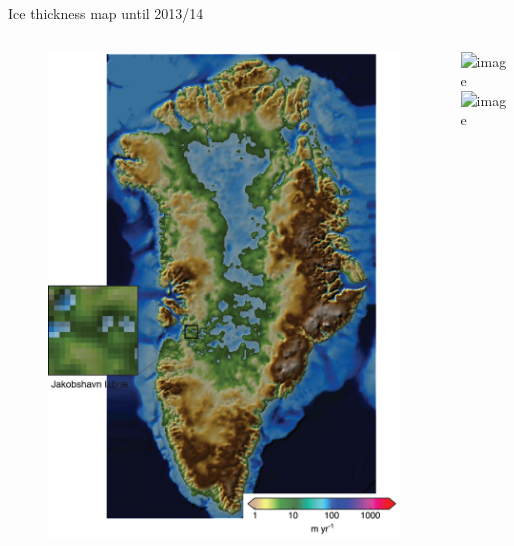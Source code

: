 \documentclass[hide notes,intlimits]{beamer}
\begin{document}
\begin{frame}{Ice thickness map until 2013/14}
\vspace{-0.74em}
  \begin{columns}
    \column[c]{5cm}
    \begin{figure}
      \includegraphics[width=\textwidth]{greenland-obs-basal-overview}
    \end{figure}
    \column[c]{5cm}
    \includegraphics<1>[width=\textwidth]{jakobshavn-bed-5000m-ba01}
    \includegraphics<2>[width=\textwidth]{jakobshavn-speed-exp-4500m-ba01}
  \end{columns}
\end{frame}
\end{document}

